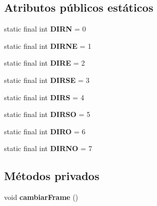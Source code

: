 \subsection*{Atributos públicos estáticos}
\begin{DoxyCompactItemize}
\item 
\hypertarget{classBatallaEspacial_1_1Player_a7877a2867209a8388941aec58b68fb2c}{
static final int {\bfseries DIRN} = 0}
\label{classBatallaEspacial_1_1Player_a7877a2867209a8388941aec58b68fb2c}

\item 
\hypertarget{classBatallaEspacial_1_1Player_acfa5b88dc2b76634efedfcfad1a0dd0a}{
static final int {\bfseries DIRNE} = 1}
\label{classBatallaEspacial_1_1Player_acfa5b88dc2b76634efedfcfad1a0dd0a}

\item 
\hypertarget{classBatallaEspacial_1_1Player_a340908c7db730dd764c95392886d52f6}{
static final int {\bfseries DIRE} = 2}
\label{classBatallaEspacial_1_1Player_a340908c7db730dd764c95392886d52f6}

\item 
\hypertarget{classBatallaEspacial_1_1Player_a310a4ca05c26dd1dbec2b3ae3ffb9e63}{
static final int {\bfseries DIRSE} = 3}
\label{classBatallaEspacial_1_1Player_a310a4ca05c26dd1dbec2b3ae3ffb9e63}

\item 
\hypertarget{classBatallaEspacial_1_1Player_a097e115dfd856126ea7f50ca616ecdd9}{
static final int {\bfseries DIRS} = 4}
\label{classBatallaEspacial_1_1Player_a097e115dfd856126ea7f50ca616ecdd9}

\item 
\hypertarget{classBatallaEspacial_1_1Player_a6b3f96de107188b5cf0eaee0cd04c07a}{
static final int {\bfseries DIRSO} = 5}
\label{classBatallaEspacial_1_1Player_a6b3f96de107188b5cf0eaee0cd04c07a}

\item 
\hypertarget{classBatallaEspacial_1_1Player_a690c8e0b8f6e22653b50f8952c8dc365}{
static final int {\bfseries DIRO} = 6}
\label{classBatallaEspacial_1_1Player_a690c8e0b8f6e22653b50f8952c8dc365}

\item 
\hypertarget{classBatallaEspacial_1_1Player_a2b21c346a0ac52bbe0e55995608f7346}{
static final int {\bfseries DIRNO} = 7}
\label{classBatallaEspacial_1_1Player_a2b21c346a0ac52bbe0e55995608f7346}

\end{DoxyCompactItemize}
\subsection*{Métodos privados}
\begin{DoxyCompactItemize}
\item 
\hypertarget{classBatallaEspacial_1_1Player_ad836348d00fc448ab0be4e58abc5ff0b}{
void {\bfseries cambiarFrame} ()}
\label{classBatallaEspacial_1_1Player_ad836348d00fc448ab0be4e58abc5ff0b}

\end{DoxyCompactItemize}
